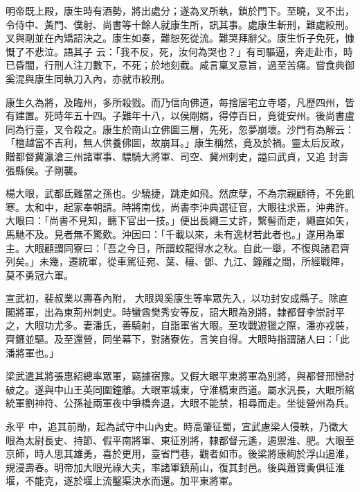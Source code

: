 \begin{pinyinscope}
 明帝既上殿，康生時有酒勢，將出處分；遂為叉所執，鎖於門下。至曉，叉不出，令侍中、黃門、僕射、尚書等十餘人就康生所，訊其事。處康生斬刑，難處絞刑。叉與剛並在內矯詔決之。康生如奏，難恕死從流。難哭拜辭父。康生忻子免死，慷慨了不悲泣。語其子
 云：「我不反，死，汝何為哭也？」有司驅逼，奔走赴市，時已昏闇，行刑人注刀數下，不死；於地刻截。咸言稟叉意旨，過至苦痛。嘗食典御奚混與康生同執刀入內，亦就市絞刑。



 康生久為將，及臨州，多所殺戮。而乃信向佛道，每捨居宅立寺塔，凡歷四州，皆有建置。死時年五十四。子難年十八，以侯剛婿，得停百日，竟徙安州。後尚書盧同為行臺，叉令殺之。康生於南山立佛圖三層，先死，忽夢崩壞。沙門有為解云：「檀越當不吉利，無人供養佛圖，故崩耳。」康生稱然，竟及於禍。靈太后反政，贈都督冀瀛滄三州諸軍事、驃騎大將軍、司空、冀州刺史，謚曰武貞，又追
 封壽張縣侯。子剛襲。



 楊大眼，武都氐難當之孫也。少驍捷，跳走如飛。然庶孽，不為宗親顧待，不免飢寒。太和中，起家奉朝請。時將南伐，尚書李沖典選征官，大眼往求焉，沖弗許。大眼曰：「尚書不見知，聽下官出一技。」便出長繩三丈許，繫髻而走，繩直如矢，馬馳不及。見者無不驚歎。沖因曰：「千載以來，未有逸材若此者也。」遂用為軍主。大眼顧謂同寮曰：「吾之今日，所謂蛟龍得水之秋。自此一舉，不復與諸君齊列矣。」未幾，遷統軍，從車駕征宛、葉、穰、鄧、九江、鐘離之間，所經戰陣，莫不勇冠六軍。



 宣武初，裴叔業以壽春內附，
 大眼與奚康生等率眾先入，以功封安成縣子。除直閣將軍，出為東荊州刺史。時蠻酋樊秀安等反，詔大眼為別將，隸都督李崇討平之，大眼功尤多。妻潘氏，善騎射，自詣軍省大眼。至攻戰遊獵之際，潘亦戎裝，齊鑣並驅。及至還營，同坐幕下，對諸寮佐，言笑自得。大眼時指謂諸人曰：「此潘將軍也。」



 梁武遣其將張惠紹總率眾軍，竊據宿豫。又假大眼平東將軍為別將，與都督邢巒討破之。遂與中山王英同圍鐘離。大眼軍城東，守淮橋東西道。屬水汎長，大眼所綰統軍劉神符、公孫祉兩軍夜中爭橋奔退，大眼不能禁，相尋而走。坐徙營州為兵。



 永平
 中，追其前勛，起為試守中山內史。時高肇征蜀，宣武慮梁人侵軼，乃徵大眼為太尉長史、持節、假平南將軍、東征別將，隸都督元遙，遏禦淮、肥。大眼至京師，時人思其雄勇，喜於更用，臺省門巷，觀者如市。後梁將康絢於浮山遏淮，規浸壽春。明帝加大眼光祿大夫，率諸軍鎮荊山，復其封邑。後與蕭寶夤俱征淮堰，不能克，遂於堰上流鑿渠決水而還。加平東將軍。




\end{pinyinscope}
